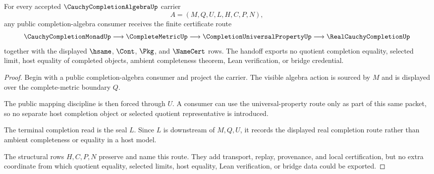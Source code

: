 \begin{theorem}
\label{thm:cauchy-completion-algebra-public-handoff}
For every accepted $\CauchyCompletionAlgebraUp$ carrier
$$
A=(M,Q,U,L,H,C,P,N),
$$
any public completion-algebra consumer receives the finite certificate route
$$
\CauchyCompletionMonadUp \longrightarrow \CompleteMetricUp \longrightarrow \CompletionUniversalPropertyUp \longrightarrow \RealCauchyCompletionUp
$$
together with the displayed $\hsame$, $\Cont$, $\Pkg$, and $\NameCert$ rows. The handoff exports no quotient completion equality, selected limit, host equality of completed objects, ambient completeness theorem, Lean verification, or bridge credential.
\end{theorem}
\begin{proof}
Begin with a public completion-algebra consumer and project the carrier. The visible algebra action is sourced by $M$ and is displayed over the complete-metric boundary $Q$.

The public mapping discipline is then forced through $U$. A consumer can use the universal-property route only as part of this same packet, so no separate host completion object or selected quotient representative is introduced.

The terminal completion read is the seal $L$. Since $L$ is downstream of $M,Q,U$, it records the displayed real completion route rather than ambient completeness or equality in a host model.

The structural rows $H,C,P,N$ preserve and name this route. They add transport, replay, provenance, and local certification, but no extra coordinate from which quotient equality, selected limits, host equality, Lean verification, or bridge data could be exported.
\end{proof}

